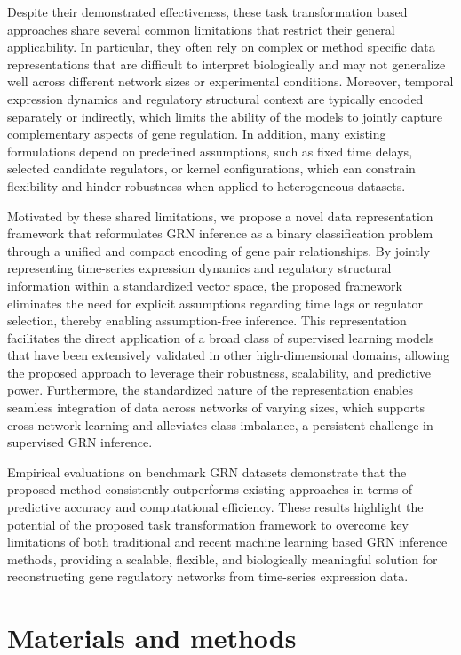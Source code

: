 Despite their demonstrated effectiveness, these task transformation based approaches share several common limitations that restrict their general applicability. In particular, they often rely on complex or method specific data representations that are difficult to interpret biologically and may not generalize well across different network sizes or experimental conditions. Moreover, temporal expression dynamics and regulatory structural context are typically encoded separately or indirectly, which limits the ability of the models to jointly capture complementary aspects of gene regulation. In addition, many existing formulations depend on predefined assumptions, such as fixed time delays, selected candidate regulators, or kernel configurations, which can constrain flexibility and hinder robustness when applied to heterogeneous datasets.

Motivated by these shared limitations, we propose a novel data representation framework that reformulates GRN inference as a binary classification problem through a unified and compact encoding of gene pair relationships. By jointly representing time-series expression dynamics and regulatory structural information within a standardized vector space, the proposed framework eliminates the need for explicit assumptions regarding time lags or regulator selection, thereby enabling assumption-free inference. This representation facilitates the direct application of a broad class of supervised learning models that have been extensively validated in other high-dimensional domains, allowing the proposed approach to leverage their robustness, scalability, and predictive power. Furthermore, the standardized nature of the representation enables seamless integration of data across networks of varying sizes, which supports cross-network learning and alleviates class imbalance, a persistent challenge in supervised GRN inference.

Empirical evaluations on benchmark GRN datasets demonstrate that the proposed method consistently outperforms existing approaches in terms of predictive accuracy and computational efficiency. These results highlight the potential of the proposed task transformation framework to overcome key limitations of both traditional and recent machine learning based GRN inference methods, providing a scalable, flexible, and biologically meaningful solution for reconstructing gene regulatory networks from time-series expression data.
\section{Materials and methods}
